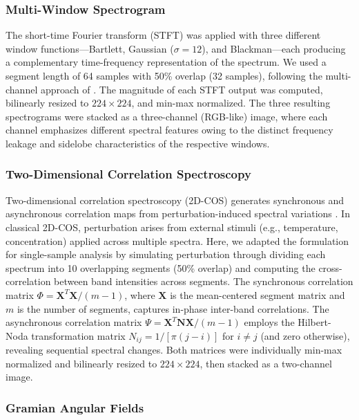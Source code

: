 \subsubsection{Multi-Window Spectrogram}

The short-time Fourier transform (STFT) was applied with three different window functions---Bartlett, Gaussian ($\sigma = 12$), and Blackman---each producing a complementary time-frequency representation of the spectrum. We used a segment length of 64 samples with 50\% overlap (32 samples), following the multi-channel approach of \citet{shuai2025multichannel}. The magnitude of each STFT output was computed, bilinearly resized to $224 \times 224$, and min-max normalized. The three resulting spectrograms were stacked as a three-channel (RGB-like) image, where each channel emphasizes different spectral features owing to the distinct frequency leakage and sidelobe characteristics of the respective windows.

\subsubsection{Two-Dimensional Correlation Spectroscopy}

Two-dimensional correlation spectroscopy (2D-COS) generates synchronous and asynchronous correlation maps from perturbation-induced spectral variations \citep{noda2004twodimensional}. In classical 2D-COS, perturbation arises from external stimuli (e.g., temperature, concentration) applied across multiple spectra. Here, we adapted the formulation for single-sample analysis by simulating perturbation through dividing each spectrum into 10 overlapping segments (50\% overlap) and computing the cross-correlation between band intensities across segments. The synchronous correlation matrix $\Phi = \mathbf{X}^T \mathbf{X} / (m-1)$, where $\mathbf{X}$ is the mean-centered segment matrix and $m$ is the number of segments, captures in-phase inter-band correlations. The asynchronous correlation matrix $\Psi = \mathbf{X}^T \mathbf{N} \mathbf{X} / (m-1)$ employs the Hilbert-Noda transformation matrix $N_{ij} = 1/[\pi(j-i)]$ for $i \neq j$ (and zero otherwise), revealing sequential spectral changes. Both matrices were individually min-max normalized and bilinearly resized to $224 \times 224$, then stacked as a two-channel image.

\subsubsection{Gramian Angular Fields}

